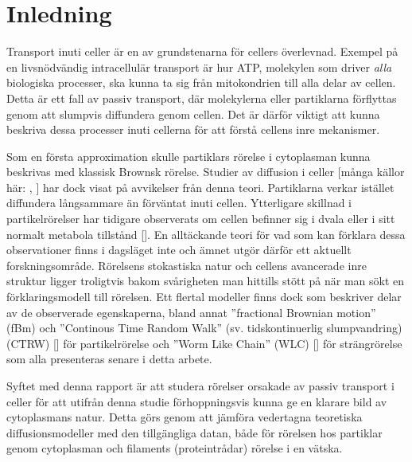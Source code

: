 \chapter{Inledning}



Transport inuti celler är en av grundstenarna för cellers överlevnad. Exempel på en livsnödvändig intracellulär transport är hur ATP, molekylen som driver \emph{alla} biologiska processer, ska kunna ta sig från mitokondrien till alla delar av cellen. Detta är ett fall av passiv transport, där molekylerna eller partiklarna förflyttas genom att slumpvis diffundera genom cellen. Det är därför viktigt att kunna beskriva dessa processer inuti cellerna för att förstå cellens inre mekanismer. 


Som en första approximation skulle partiklars rörelse i cytoplasman kunna beskrivas med klassisk Brownsk rörelse. Studier av diffusion i celler [många källor här: \cite{Gou_etal2014}, \cite{Dix_Crowdingeffects2008}] har dock visat på avvikelser från denna teori. Partiklarna verkar istället diffundera långsammare än förväntat inuti cellen. Ytterligare skillnad i partikelrörelser har tidigare observerats om cellen befinner sig i dvala eller i sitt normalt metabola tillstånd []. En alltäckande teori för vad som kan förklara dessa observationer finns i dagsläget inte och ämnet utgör därför ett aktuellt forskningsområde.
Rörelsens stokastiska natur och cellens avancerade inre struktur ligger troligtvis bakom svårigheten man hittills stött på när man sökt en förklaringsmodell till rörelsen. Ett flertal modeller finns dock som beskriver delar av de observerade egenskaperna, bland annat ''fractional Brownian motion'' (fBm) \cite{Mandelbrot_fBm1968} och ''Continous Time Random Walk'' (sv. tidskontinuerlig slumpvandring) (CTRW) [] för partikelrörelse och ''Worm Like Chain'' (WLC) [] för strängrörelse som alla presenteras senare i detta arbete.

Syftet med denna rapport är att studera rörelser orsakade av passiv transport i celler för att utifrån denna studie förhoppningsvis kunna ge en klarare bild av cytoplasmans natur. Detta görs genom att jämföra vedertagna teoretiska diffusionsmodeller med den tillgängliga datan, både för rörelsen hos partiklar genom cytoplasman och filaments (proteintrådar) rörelse i en vätska. %


